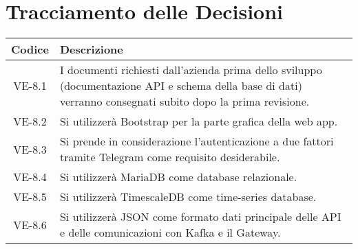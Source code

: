 \section*{Tracciamento delle Decisioni}

\begin{center}
	\begin{longtable}{|c|p{14.5cm}|}
	\hline
	\rowcolor{lighter-grayer}
	\textbf{Codice} & \textbf{Descrizione} \\
	\hline
	\endfirsthead
	
	\hline
	VE-8.1 & I documenti richiesti dall'azienda prima dello sviluppo (documentazione API e schema della base di dati) verranno consegnati subito dopo la prima revisione. \\
	\hline
	VE-8.2 & Si utilizzerà Bootstrap per la parte grafica della web app. \\
	\hline
	VE-8.3 & Si prende in considerazione l'autenticazione a due fattori tramite Telegram come requisito desiderabile. \\
	\hline
	VE-8.4 & Si utilizzerà MariaDB come database relazionale. \\
	\hline
	VE-8.5 & Si utilizzerà TimescaleDB come time-series database. \\
	\hline
	VE-8.6 & Si utilizzerà JSON come formato dati principale delle API e delle comunicazioni con Kafka e il Gateway. \\
	\hline
	\end{longtable}
\end{center}